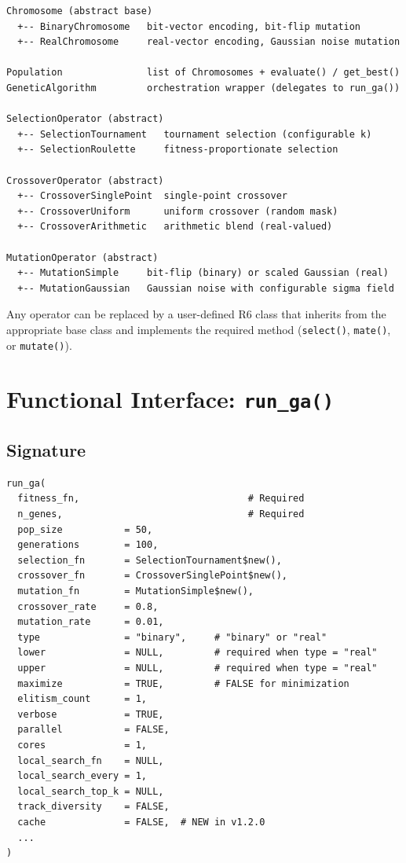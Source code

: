 \documentclass[11pt,a4paper]{article}
\begin{document}
\begin{lstlisting}
Chromosome (abstract base)
  +-- BinaryChromosome   bit-vector encoding, bit-flip mutation
  +-- RealChromosome     real-vector encoding, Gaussian noise mutation

Population               list of Chromosomes + evaluate() / get_best()
GeneticAlgorithm         orchestration wrapper (delegates to run_ga())

SelectionOperator (abstract)
  +-- SelectionTournament   tournament selection (configurable k)
  +-- SelectionRoulette     fitness-proportionate selection

CrossoverOperator (abstract)
  +-- CrossoverSinglePoint  single-point crossover
  +-- CrossoverUniform      uniform crossover (random mask)
  +-- CrossoverArithmetic   arithmetic blend (real-valued)

MutationOperator (abstract)
  +-- MutationSimple     bit-flip (binary) or scaled Gaussian (real)
  +-- MutationGaussian   Gaussian noise with configurable sigma field
\end{lstlisting}

Any operator can be replaced by a user-defined R6 class that inherits from
the appropriate base class and implements the required method
(\texttt{select()}, \texttt{mate()}, or \texttt{mutate()}).

\section{Functional Interface: \texttt{run\_ga()}}

\subsection{Signature}

\begin{lstlisting}
run_ga(
  fitness_fn,                              # Required
  n_genes,                                 # Required
  pop_size           = 50,
  generations        = 100,
  selection_fn       = SelectionTournament$new(),
  crossover_fn       = CrossoverSinglePoint$new(),
  mutation_fn        = MutationSimple$new(),
  crossover_rate     = 0.8,
  mutation_rate      = 0.01,
  type               = "binary",     # "binary" or "real"
  lower              = NULL,         # required when type = "real"
  upper              = NULL,         # required when type = "real"
  maximize           = TRUE,         # FALSE for minimization
  elitism_count      = 1,
  verbose            = TRUE,
  parallel           = FALSE,
  cores              = 1,
  local_search_fn    = NULL,
  local_search_every = 1,
  local_search_top_k = NULL,
  track_diversity    = FALSE,
  cache              = FALSE,  # NEW in v1.2.0
  ...
)
\end{lstlisting}
\end{document}
